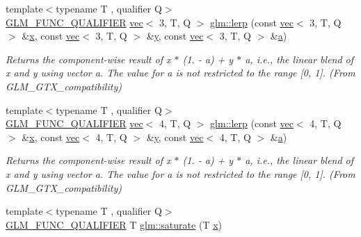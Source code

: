 \begin{DoxyCompactItemize}
{\footnotesize template$<$typename T , qualifier Q$>$ }\\\hyperlink{setup_8hpp_a33fdea6f91c5f834105f7415e2a64407}{G\+L\+M\+\_\+\+F\+U\+N\+C\+\_\+\+Q\+U\+A\+L\+I\+F\+I\+ER} \hyperlink{structglm_1_1vec}{vec}$<$ 3, T, Q $>$ \hyperlink{group__gtx__compatibility_ga4ae1a616c8540a2649eab8e0cd051bb3}{glm\+::lerp} (const \hyperlink{structglm_1_1vec}{vec}$<$ 3, T, Q $>$ \&\hyperlink{_s_d_l__opengl_8h_ad0e63d0edcdbd3d79554076bf309fd47}{x}, const \hyperlink{structglm_1_1vec}{vec}$<$ 3, T, Q $>$ \&\hyperlink{_s_d_l__opengl_8h_a1675d9d7bb68e1657ff028643b4037e3}{y}, const \hyperlink{structglm_1_1vec}{vec}$<$ 3, T, Q $>$ \&\hyperlink{_s_d_l__opengl__glext_8h_a3309789fc188587d666cda5ece79cf82}{a})
\begin{DoxyCompactList}\small\item\em Returns the component-\/wise result of x $\ast$ (1. -\/ a) + y $\ast$ a, i.\+e., the linear blend of x and y using vector a. The value for a is not restricted to the range \mbox{[}0, 1\mbox{]}. (From G\+L\+M\+\_\+\+G\+T\+X\+\_\+compatibility) \end{DoxyCompactList}\item 
{\footnotesize template$<$typename T , qualifier Q$>$ }\\\hyperlink{setup_8hpp_a33fdea6f91c5f834105f7415e2a64407}{G\+L\+M\+\_\+\+F\+U\+N\+C\+\_\+\+Q\+U\+A\+L\+I\+F\+I\+ER} \hyperlink{structglm_1_1vec}{vec}$<$ 4, T, Q $>$ \hyperlink{group__gtx__compatibility_gab5477ab69c40de4db5d58d3359529724}{glm\+::lerp} (const \hyperlink{structglm_1_1vec}{vec}$<$ 4, T, Q $>$ \&\hyperlink{_s_d_l__opengl_8h_ad0e63d0edcdbd3d79554076bf309fd47}{x}, const \hyperlink{structglm_1_1vec}{vec}$<$ 4, T, Q $>$ \&\hyperlink{_s_d_l__opengl_8h_a1675d9d7bb68e1657ff028643b4037e3}{y}, const \hyperlink{structglm_1_1vec}{vec}$<$ 4, T, Q $>$ \&\hyperlink{_s_d_l__opengl__glext_8h_a3309789fc188587d666cda5ece79cf82}{a})
\begin{DoxyCompactList}\small\item\em Returns the component-\/wise result of x $\ast$ (1. -\/ a) + y $\ast$ a, i.\+e., the linear blend of x and y using vector a. The value for a is not restricted to the range \mbox{[}0, 1\mbox{]}. (From G\+L\+M\+\_\+\+G\+T\+X\+\_\+compatibility) \end{DoxyCompactList}\item 
{\footnotesize template$<$typename T , qualifier Q$>$ }\\\hyperlink{setup_8hpp_a33fdea6f91c5f834105f7415e2a64407}{G\+L\+M\+\_\+\+F\+U\+N\+C\+\_\+\+Q\+U\+A\+L\+I\+F\+I\+ER} T \hyperlink{group__gtx__compatibility_ga0fd09e616d122bc2ed9726682ffd44b7}{glm\+::saturate} (T \hyperlink{_s_d_l__opengl_8h_ad0e63d0edcdbd3d79554076bf309fd47}{x})

\end{DoxyCompactItemize}
